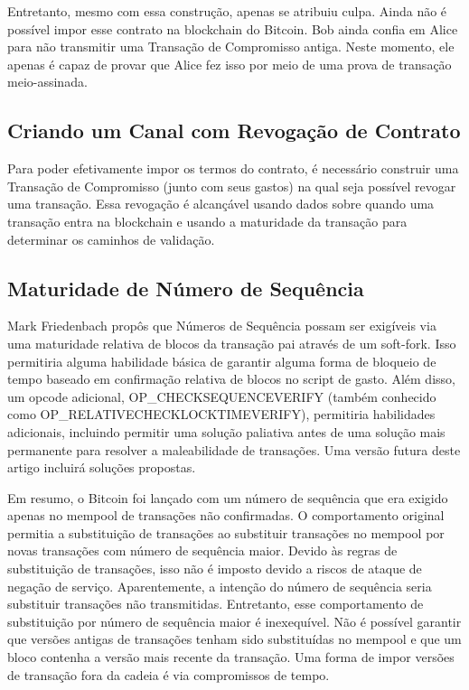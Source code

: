 \documentclass[letterpaper,11pt]{article}
\begin{document}
Entretanto, mesmo com essa construção, apenas se atribuiu culpa. Ainda não é
possível impor esse contrato na blockchain do Bitcoin. Bob ainda confia em
Alice para não transmitir uma Transação de Compromisso antiga. Neste momento,
ele apenas é capaz de provar que Alice fez isso por meio de uma prova de
transação meio-assinada.

\subsection{Criando um Canal com Revogação de Contrato}

Para poder efetivamente impor os termos do contrato, é necessário construir
uma Transação de Compromisso (junto com seus gastos) na qual seja possível
revogar uma transação. Essa revogação é alcançável usando dados sobre quando
uma transação entra na blockchain e usando a maturidade da transação para
determinar os caminhos de validação.

\subsection{Maturidade de Número de Sequência}

Mark Friedenbach propôs que Números de Sequência possam ser exigíveis via uma
maturidade relativa de blocos da transação pai através de um
soft-fork\cite{seqnum}. Isso permitiria alguma habilidade básica de garantir
alguma forma de bloqueio de tempo baseado em confirmação relativa de blocos
no script de gasto. Além disso, um opcode adicional,
OP\_CHECKSEQUENCEVERIFY\cite{csv} (também conhecido como
OP\_RELATIVECHECKLOCKTIMEVERIFY)\cite{relCLTV}, permitiria habilidades
adicionais, incluindo permitir uma solução paliativa antes de uma solução
mais permanente para resolver a maleabilidade de transações. Uma versão
futura deste artigo incluirá soluções propostas.

Em resumo, o Bitcoin foi lançado com um número de sequência que era exigido
apenas no mempool de transações não confirmadas. O comportamento original
permitia a substituição de transações ao substituir transações no mempool por
novas transações com número de sequência maior. Devido às regras de
substituição de transações, isso não é imposto devido a riscos de ataque de
negação de serviço. Aparentemente, a intenção do número de sequência seria
substituir transações não transmitidas. Entretanto, esse comportamento de
substituição por número de sequência maior é inexequível. Não é possível
garantir que versões antigas de transações tenham sido substituídas no
mempool e que um bloco contenha a versão mais recente da transação. Uma forma
de impor versões de transação fora da cadeia é via compromissos de tempo.
\end{document}
